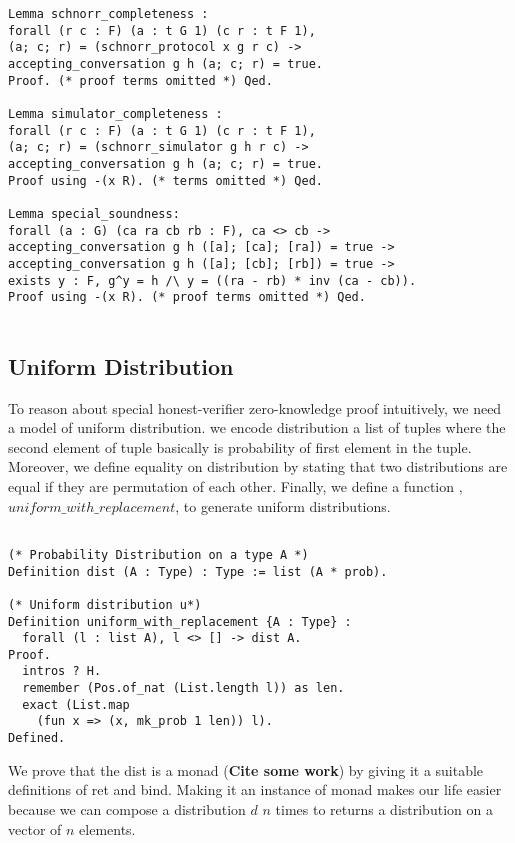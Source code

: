 \documentclass[conference,compsoc]{IEEEtran}
\begin{document}
\begin{lstlisting}[language=Coq]
Lemma schnorr_completeness : 
forall (r c : F) (a : t G 1) (c r : t F 1),
(a; c; r) = (schnorr_protocol x g r c) ->
accepting_conversation g h (a; c; r) = true.
Proof. (* proof terms omitted *) Qed.
  
Lemma simulator_completeness : 
forall (r c : F) (a : t G 1) (c r : t F 1),
(a; c; r) = (schnorr_simulator g h r c) ->
accepting_conversation g h (a; c; r) = true.
Proof using -(x R). (* terms omitted *) Qed. 
  
Lemma special_soundness: 
forall (a : G) (ca ra cb rb : F), ca <> cb ->
accepting_conversation g h ([a]; [ca]; [ra]) = true ->  
accepting_conversation g h ([a]; [cb]; [rb]) = true ->
exists y : F, g^y = h /\ y = ((ra - rb) * inv (ca - cb)).
Proof using -(x R). (* proof terms omitted *) Qed.
  
\end{lstlisting}
 





  
  \subsection{Uniform Distribution}
  To reason about special honest-verifier zero-knowledge proof 
  intuitively, we need a model of uniform distribution. 
  we encode distribution a list of tuples where the 
  second element of tuple basically is probability of first element 
  in the tuple. Moreover, we define equality on distribution by 
  stating that two distributions are equal if they are permutation 
  of each other. Finally, we define a function , $uniform\_with\_replacement$, 
  to generate uniform distributions. 

  \begin{lstlisting}[language=Coq]
    
(* Probability Distribution on a type A *)
Definition dist (A : Type) : Type := list (A * prob).
  
(* Uniform distribution u*)
Definition uniform_with_replacement {A : Type} : 
  forall (l : list A), l <> [] -> dist A.
Proof.
  intros ? H.
  remember (Pos.of_nat (List.length l)) as len.
  exact (List.map 
    (fun x => (x, mk_prob 1 len)) l).
Defined.
\end{lstlisting}

We prove that the dist is a monad (\textbf{Cite some work}) by 
giving it a suitable definitions of ret and bind. Making 
it an instance of monad makes our life easier because 
we can compose a distribution $d$ $n$ times to 
returns a distribution on a vector of $n$ elements. 
\end{document}

